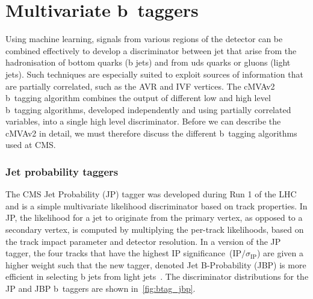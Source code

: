 \section{Multivariate b~taggers}
Using machine learning, signals from various regions of the detector can be combined effectively to develop a discriminator between jet that arise from the hadronisation of bottom quarks (b jets) and from uds quarks or gluons (light jets). Such techniques are especially suited to exploit sources of information that are partially correlated, such as the AVR and IVF vertices. The cMVAv2 b~tagging algorithm combines the output of different low and high level b~tagging algorithms, developed independently and using partially correlated variables, into a single high level discriminator. Before we can describe the cMVAv2 in detail, we must therefore discuss the different b~tagging algorithms used at CMS.

\subsubsection{Jet probability taggers}
The CMS Jet Probability (JP) tagger was developed during Run 1 of the LHC and is a simple multivariate likelihood discriminator based on track properties. In JP, the likelihood for a jet to originate from the primary vertex, as opposed to a secondary vertex, is computed by multiplying the per-track likelihoods, based on the track impact parameter and detector resolution. In a version of the JP tagger, the four tracks that have the highest IP significance~($\mathrm{IP} / \sigma_{\mathrm{IP}}$) are given a higher weight such that the new tagger, denoted Jet B-Probability (JBP) is more efficient in selecting b jets from light jets~\cite{Chatrchyan:2012jua}. The discriminator distributions for the JP and JBP b~taggers are shown in~\cref{fig:btag_jbp}.

